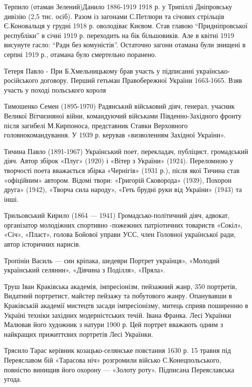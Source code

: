 Терпило (отаман Зелений)Данило   1886-1919 1918 р. у Трипіллі Дніпровську дивізію (2,5 тис. осіб). Разом із загонами С.Петлюри та січових стрільців Є.Коновальця у грудні 1918 р. оволодіває Києвом. Став главою “Придніпровської республіки” в січні 1919 р. переходить на бік більшовиків. Але в квітні 1919 висунуте гасло: “Ради без комуністів”. Остаточно загони отамана були знищені в серпні 1919 р., отамана було смертельно поранено. 

Тетеря Павло  - При Б.Хмельницькому брав участь у підписанні українсько-російського договору. Перший гетьман Правобережної України 1663-1665. Взяв участь у поході польського короля

Тимошенко Семен (1895-1970) Радянський військовий діяч, генерал, учасник Великої Вітчизняної війни, командуючий військами Південно-Західного фронту після загибелі М.Кирпоноса, представник Ставки Верховного головнокомандування. У 1939 р. керував «визволенням Західної України».

Тичина Павло (1891-1967) Український поет, перекладач, публіцист, громадський діяч. Автор збірок «Плуг» (1920) і «Вітер з України» (1924). Переломною у творчості поета вважається збірка «Чернігів» (1931 р.), після якої Тичина став «офіційним» автором. Відомі твори: «Григорій Сковорода» (1939), Похорон друга» (1942), «Творча сила народу», «Геть брудні руки від України» (1943) та інші.

Трильовський Кирило (1864 --- 1941) Громадсько-політичний діяч, адвокат, організатор молодіжних спортивно -пожежних патріотичних товариств «Сокіл», «Січ», «Пласт», голова Бойової управи УСС, член Головної української ради, автор історичних нарисів.

Тропінін Василь --- син кріпака, шедеври Портрет українця», «Молодий український селянин», «Дівчина з Поділля», «Пряла».

Труш Іван Краківська академія, імпресіонізм,  пейзажний жанр, 350 портретів, Видатний портретист, майстер пейзажу та побутового жанру. Опанувавши в Краківській академії мистецтв засади імпресіонізму, митець сприяв поширенню в Україні техніки західних модерністських течій. Івана Франка.  Лесі Українки Малював його художник з натури 1900 р. Цей портрет вважають одним з найкращих прижиттєвих портретів Лесі Українки.  

Трясило Тарас керівник козацько-селянське повстання 1630 р. 15 травня під Переяславом бій «Тарасова ніч» розгромили військо С.Конецпольського, повністю винищив його охорону --- «Золоту роту». Підписана Переяславська угода.

